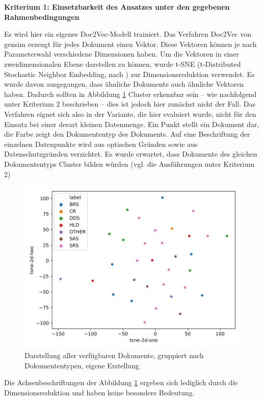 {\bf Kriterium 1: Einsetzbarkeit des Ansatzes unter den gegebenen Rahmenbedingungen}

Es wird hier ein eigenes Doc2Vec-Modell trainiert. Das Verfahren Doc2Vec von gensim erzeugt für jedes Dokument einen Vektor. Diese Vektoren können je nach Parameterwahl verschiedene Dimensionen haben. Um die Vektoren in einer zweidimensionalen Ebene darstellen zu können, wurde t-SNE (t-Distributed Stochastic Neighbor Embedding, nach \cite{t-SNE}) zur Dimensionsreduktion verwendet. Es wurde davon ausgegangen, dass ähnliche Dokumente auch ähnliche Vektoren haben. Dadurch sollten in Abbildung \ref{Abbildung:doc2vec1} Cluster erkennbar sein – wie nachfolgend unter Kriterium 2 beschrieben – dies ist jedoch hier zunächst nicht der Fall. Das Verfahren eignet sich also in der Variante, die hier evaluiert wurde, nicht für den Einsatz bei einer derart kleinen Datenmenge. Ein Punkt stellt ein Dokument dar, die Farbe zeigt den Dokumententyp des Dokuments. Auf eine Beschriftung der einzelnen Datenpunkte wird aus optischen Gründen sowie aus Datenschutzgründen verzichtet. Es wurde erwartet, dass Dokumente des gleichen Dokumententyps Cluster bilden würden (vgl. die Ausführungen unter Kriterium 2)

\begin{figure}[h]
\centering
\includegraphics[scale=0.95]{content/pics/Picture_14.png}
\caption{Darstellung aller verfügbaren Dokumente, gruppiert nach Dokumententypen, eigene Erstellung}
\label{Abbildung:doc2vec1}
\end{figure}

Die Achsenbeschriftungen der Abbildung \ref{Abbildung:doc2vec1} ergeben sich lediglich durch die Dimensionsreduktion und haben keine besondere Bedeutung.

